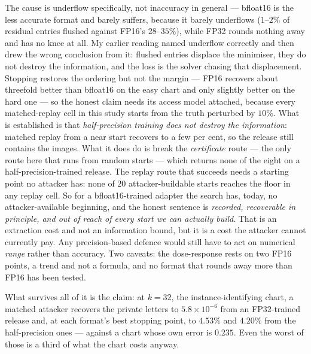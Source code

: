 The cause is underflow specifically, not inaccuracy in general --- bfloat16 is
the less accurate format and barely suffers, because it barely underflows
($1$--$2\%$ of residual entries flushed against FP16's $28$--$35\%$), while
FP32 rounds nothing away and has no knee at all. My earlier reading named
underflow correctly and then drew the wrong conclusion from it: flushed
entries displace the minimiser, they do not destroy the information, and the
loss is the solver chasing that displacement. Stopping restores the ordering
but not the margin --- FP16 recovers about threefold better than bfloat16 on
the easy chart and only slightly better on the hard one --- so the honest
claim needs its access model attached, because every matched-replay cell in
this study starts from the truth perturbed by $10\%$. What is established is
that \emph{half-precision training does not destroy the information}: matched
replay from a near start recovers to a few per cent, so the release still
contains the images. What it does do is break the \emph{certificate} route ---
the only route here that runs from random starts --- which returns none of the
eight on a half-precision-trained release. The replay route that succeeds
needs a starting point no attacker has: none of $20$ attacker-buildable starts
reaches the floor in any replay cell. So for a bfloat16-trained adapter the
search has, today, no attacker-available beginning, and the honest sentence is
\emph{recorded, recoverable in principle, and out of reach of every start we
can actually build}. That is an extraction cost and not an information bound,
but it is a cost the attacker cannot currently pay. Any precision-based
defence would still have to act on numerical \emph{range} rather than
accuracy. Two caveats: the dose-response rests on two FP16 points, a
trend and not a formula, and no format that rounds away more than FP16 has
been tested.

What survives all of it is the claim: at $k=32$, the instance-identifying
chart, a matched attacker recovers the private letters to $5.8\times10^{-6}$
from an FP32-trained release and, at each format's best stopping point, to
$4.53\%$ and $4.20\%$ from the half-precision ones --- against a chart whose own error is $0.235$. Even the
worst of those is a third of what the chart costs anyway.

